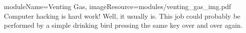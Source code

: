 \begin{needymodule}{
  moduleName=Venting Gas,
  imageResource=modules/venting_gas_img.pdf
}
{
  Computer hacking is hard work!
  Well, it usually is.
  This job could probably be performed by a simple drinking bird pressing the same key over and over again.
}
  \begin{bulletlist}
  \end{bulletlist}

\end{needymodule}
